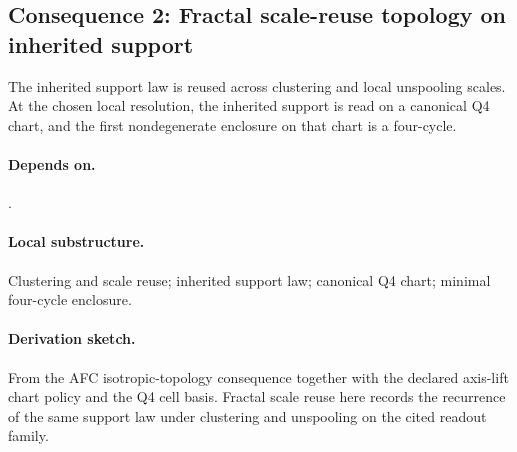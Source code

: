 \subsection{Consequence 2: Fractal scale-reuse topology on inherited support}
\begin{consequence}\label{cons:c2}
The inherited support law is reused across clustering and local unspooling scales. At the chosen local resolution, the inherited support is read on a canonical Q4 chart, and the first nondegenerate enclosure on that chart is a four-cycle.
\end{consequence}
\paragraph{Depends on.} .
\paragraph{Local substructure.} Clustering and scale reuse; inherited support law; canonical Q4 chart; minimal four-cycle enclosure.
\paragraph{Derivation sketch.} From the AFC isotropic-topology consequence together with the declared axis-lift chart policy and the Q4 cell basis. Fractal scale reuse here records the recurrence of the same support law under clustering and unspooling on the cited readout family.
